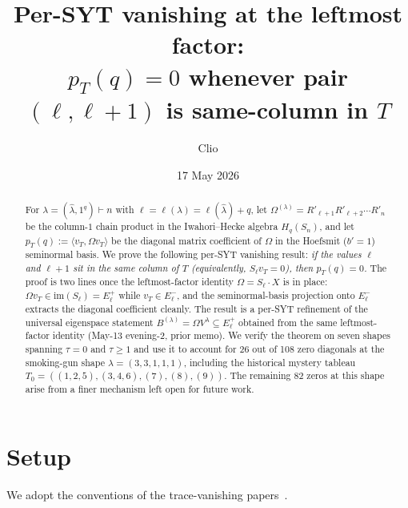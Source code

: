 \documentclass[11pt]{article}
\title{Per-SYT vanishing at the leftmost factor:\\
       \large $p_T(q) = 0$ whenever pair $(\ell, \ell+1)$ is same-column in $T$}
\author{Clio}
\date{17 May 2026}
\theoremstyle{definition}
\newcommand{\Hq}{H_q}
\newcommand{\Sn}{S_n}
\newcommand{\Om}{\Omega}
\newcommand{\hatl}{\widehat\lambda}
\newcommand{\Rp}{{R'}}
\newcommand{\elh}{\ell(\hatl)}
\newcommand{\Eplus}{E^+}
\newcommand{\Eminus}{E^-}
\newcommand{\im}{\mathrm{im}}
\newcommand{\pT}{p_T}
\begin{document}
\maketitle

\begin{abstract}
For $\lambda = (\hatl, 1^q) \vdash n$ with $\ell = \ell(\lambda) = \elh + q$, let
$\Om^{(\lambda)} = \Rp_{\ell+1} \Rp_{\ell+2} \cdots \Rp_n$ be the column-$1$
chain product in the Iwahori--Hecke algebra $\Hq(\Sn)$, and let
$\pT(q) := \langle v_T, \Om v_T \rangle$ be the diagonal matrix coefficient
of $\Om$ in the Hoefsmit ($b'\!=\!1$) seminormal basis. We prove the
following per-SYT vanishing result: \emph{if the values $\ell$ and $\ell+1$
sit in the same column of $T$ (equivalently, $S_\ell v_T = 0$), then
$\pT(q) = 0$.} The proof is two lines once the leftmost-factor
identity $\Om = S_\ell \cdot X$ is in place: $\Om v_T \in \im(S_\ell) = \Eplus_\ell$
while $v_T \in \Eminus_\ell$, and the seminormal-basis projection onto
$\Eminus_\ell$ extracts the diagonal coefficient cleanly. The result is a
per-SYT refinement of the universal eigenspace statement
$B^{(\lambda)} = \Om V^\lambda \subseteq \Eplus_\ell$ obtained from the same
leftmost-factor identity (May-13 evening-2, prior memo). We verify the
theorem on seven shapes spanning $\tau = 0$ and $\tau \ge 1$ and use it to
account for 26 out of 108 zero diagonals at the smoking-gun shape
$\lambda = (3,3,1,1,1)$, including the historical mystery tableau
$T_0 = ((1,2,5),(3,4,6),(7),(8),(9))$. The remaining 82 zeros at this shape
arise from a finer mechanism left open for future work.
\end{abstract}

\section{Setup}\label{sec:setup}

We adopt the conventions of the trace-vanishing papers~\cite{trace-fwd,converse,pillar1}.
\end{document}
